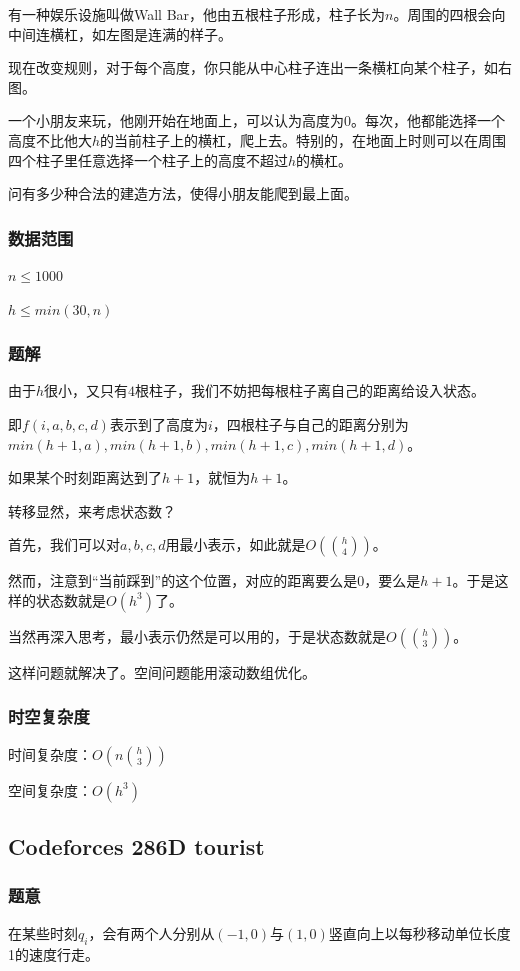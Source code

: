 \documentclass{ctexart}
\begin{document}
有一种娱乐设施叫做Wall Bar，他由五根柱子形成，柱子长为$n$。周围的四根会向中间连横杠，如左图是连满的样子。

现在改变规则，对于每个高度，你只能从中心柱子连出一条横杠向某个柱子，如右图。

一个小朋友来玩，他刚开始在地面上，可以认为高度为$0$。每次，他都能选择一个高度不比他大$h$的当前柱子上的横杠，爬上去。特别的，在地面上时则可以在周围四个柱子里任意选择一个柱子上的高度不超过$h$的横杠。

问有多少种合法的建造方法，使得小朋友能爬到最上面。
\subsubsection{数据范围}
$n \le 1000$

$h \le min(30,n)$
\subsubsection{题解}
由于$h$很小，又只有$4$根柱子，我们不妨把每根柱子离自己的距离给设入状态。

即$f(i,a,b,c,d)$表示到了高度为$i$，四根柱子与自己的距离分别为$min(h+1,a),min(h+1,b),min(h+1,c),min(h+1,d)$。

如果某个时刻距离达到了$h+1$，就恒为$h+1$。

转移显然，来考虑状态数？

首先，我们可以对$a,b,c,d$用最小表示，如此就是$O({h \choose 4})$。

然而，注意到“当前踩到”的这个位置，对应的距离要么是$0$，要么是$h+1$。于是这样的状态数就是$O(h^3)$了。

当然再深入思考，最小表示仍然是可以用的，于是状态数就是$O({h \choose 3})$。

这样问题就解决了。空间问题能用滚动数组优化。
\subsubsection{时空复杂度}
时间复杂度：$O(n {h \choose 3})$

空间复杂度：$O(h^3)$
\subsection{Codeforces 286D tourist}
\subsubsection{题意}
在某些时刻$q_i$，会有两个人分别从$(-1,0)$与$(1,0)$竖直向上以每秒移动单位长度1的速度行走。
\end{document}
